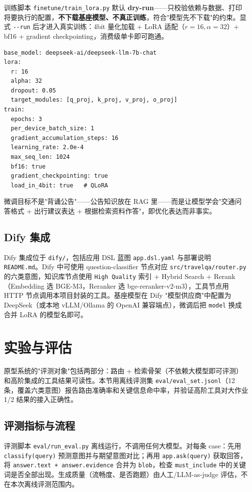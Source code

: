 \documentclass[bwprint]{report}
\begin{document}
训练脚本 \texttt{finetune/train\_lora.py} 默认 \textbf{dry-run}——只校验依赖与数据、打印将要执行的配置，\textbf{不下载基座模型、不真正训练}，符合"模型先不下载"的约束。显式 \texttt{-{}-run} 后才进入真实训练：4bit 量化加载 + LoRA 适配（$r=16, \alpha=32$）+ bf16 + gradient checkpointing，消费级单卡即可跑通。

\begin{lstlisting}[caption={LoRA 微调配置（finetune/lora\_config.yaml）}]
base_model: deepseek-ai/deepseek-llm-7b-chat
lora:
  r: 16
  alpha: 32
  dropout: 0.05
  target_modules: [q_proj, k_proj, v_proj, o_proj]
train:
  epochs: 3
  per_device_batch_size: 1
  gradient_accumulation_steps: 16
  learning_rate: 2.0e-4
  max_seq_len: 1024
  bf16: true
  gradient_checkpointing: true
  load_in_4bit: true   # QLoRA
\end{lstlisting}

微调目标不是"背诵公告"——公告知识放在 RAG 里——而是让模型学会"交通问答格式 + 出行建议表达 + 根据检索资料作答"，即优化表达而非事实。

\subsection{Dify 集成}
Dify 集成位于 \texttt{dify/}，包括应用 DSL 蓝图 \texttt{app.dsl.yaml} 与部署说明 \texttt{README.md}。Dify 中可使用 question-classifier 节点对应 \texttt{src/travelqa/router.py} 的六类意图，知识库节点使用 \texttt{High Quality} 索引 + Hybrid Search + Rerank（Embedding 选 BGE-M3，Reranker 选 bge-reranker-v2-m3），工具节点用 HTTP 节点调用本项目封装的工具。基座模型在 Dify "模型供应商"中配置为 DeepSeek（或本地 vLLM/Ollama 的 OpenAI 兼容端点），微调后把 \texttt{model} 换成合并 LoRA 的模型名即可。

\section{实验与评估}
原型系统的"评测对象"包括两部分：路由 + 检索骨架（不依赖大模型即可评测）和高阶集成的工具结果可读性。本节用离线评测集 \texttt{eval/eval\_set.jsonl}（12 条，覆盖六类意图）报告路由准确率和关键信息命中率，并验证高阶工具对大作业1/2 结果的接入正确性。

\subsection{评测指标与流程}
评测脚本 \texttt{eval/run\_eval.py} 离线运行，不调用任何大模型。对每条 case：先用 \texttt{classify(query)} 预测意图并与期望意图对比；再用 \texttt{app.ask(query)} 获取回答，将 \texttt{answer.text + answer.evidence} 合并为 \texttt{blob}，检查 \texttt{must\_include} 中的关键词是否全部出现。生成质量（流畅度、是否跑题）由人工/LLM-as-judge 评估，不在本次离线评测范围内。
\end{document}
